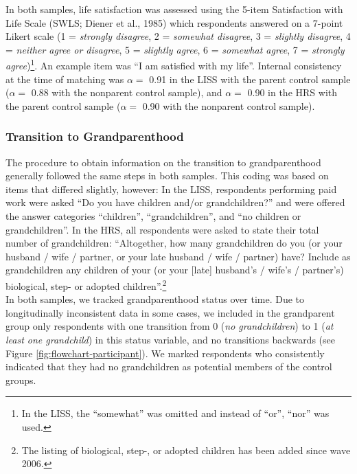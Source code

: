 \documentclass[
  english,
  man,floatsintext]{apa7}
\begin{document}
In both samples, life satisfaction was assessed using the 5-item Satisfaction with Life Scale (SWLS; Diener et al., 1985) which respondents answered on a 7-point Likert scale (1 = \emph{strongly disagree}, 2 = \emph{somewhat disagree}, 3 = \emph{slightly disagree}, 4 = \emph{neither agree or disagree}, 5 = \emph{slightly agree}, 6 = \emph{somewhat agree}, 7 = \emph{strongly agree})\footnote{In the LISS, the \enquote{somewhat} was omitted and instead of \enquote{or}, \enquote{nor} was used.}. An example item was \enquote{I am satisfied with my life}. Internal consistency at the time of matching was \(\alpha =\) 0.91 in the LISS with the parent control sample (\(\alpha =\) 0.88 with the nonparent control sample), and \(\alpha =\) 0.90 in the HRS with the parent control sample (\(\alpha =\) 0.90 with the nonparent control sample).

\hypertarget{transition-to-grandparenthood}{%
\subsubsection{Transition to Grandparenthood}\label{transition-to-grandparenthood}}

The procedure to obtain information on the transition to grandparenthood generally followed the same steps in both samples. This coding was based on items that differed slightly, however: In the LISS, respondents performing paid work were asked \enquote{Do you have children and/or grandchildren?} and were offered the answer categories \enquote{children}, \enquote{grandchildren}, and \enquote{no children or grandchildren}. In the HRS, all respondents were asked to state their total number of grandchildren: \enquote{Altogether, how many grandchildren do you (or your husband / wife / partner, or your late husband / wife / partner) have? Include as grandchildren any children of your (or your {[}late{]} husband's / wife's / partner's) biological, step- or adopted children}.\footnote{The listing of biological, step-, or adopted children has been added since wave 2006.}\\
In both samples, we tracked grandparenthood status over time. Due to longitudinally inconsistent data in some cases, we included in the grandparent group only respondents with one transition from 0 (\emph{no grandchildren}) to 1 (\emph{at least one grandchild}) in this status variable, and no transitions backwards (see Figure \ref{fig:flowchart-participant}). We marked respondents who consistently indicated that they had no grandchildren as potential members of the control groups.
\end{document}
